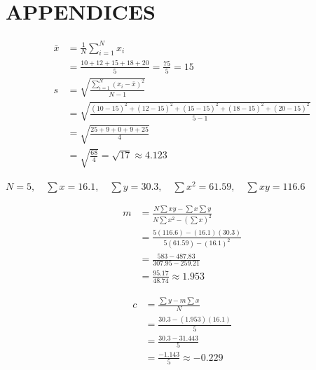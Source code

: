 \chapter*{APPENDICES}

\begin{align*}
\bar{x} &= \frac{1}{N} \sum_{i=1}^{N} x_i \\
&= \frac{10 + 12 + 15 + 18 + 20}{5} = \frac{75}{5} = 15 \\
s &= \sqrt{\frac{\sum_{i=1}^{N} (x_i - \bar{x})^2}{N-1}} \\
&= \sqrt{\frac{(10-15)^2 + (12-15)^2 + (15-15)^2 + (18-15)^2 + (20-15)^2}{5-1}} \\
&= \sqrt{\frac{25 + 9 + 0 + 9 + 25}{4}} \\
&= \sqrt{\frac{68}{4}} = \sqrt{17} \approx 4.123
\end{align*}


$N = 5, \quad \sum x = 16.1, \quad \sum y = 30.3, \quad \sum x^2 = 61.59, \quad \sum xy = 116.6$

\noindent
\begin{minipage}[t]{0.55\textwidth}
\begin{align*}
m &= \frac{N \sum xy - \sum x \sum y}{N \sum x^2 - (\sum x)^2} \\
&= \frac{5(116.6) - (16.1)(30.3)}{5(61.59) - (16.1)^2} \\
&= \frac{583 - 487.83}{307.95 - 259.21} \\
&= \frac{95.17}{48.74} \approx 1.953
\end{align*}
\end{minipage}%
\begin{minipage}[t]{0.45\textwidth}
\begin{align*}
c &= \frac{\sum y - m \sum x}{N} \\
&= \frac{30.3 - (1.953)(16.1)}{5} \\
&= \frac{30.3 - 31.443}{5} \\
&= \frac{-1.143}{5} \approx -0.229
\end{align*}
\end{minipage}
